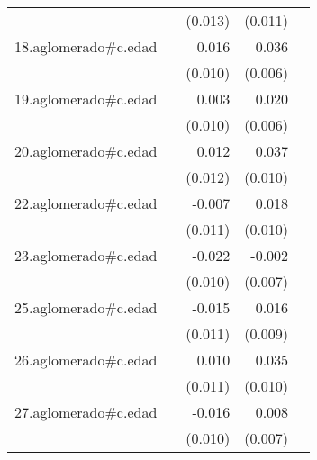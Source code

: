 {\begin{longtable}{l*{4}{D{.}{.}{-1}}}
            &                     &     (0.013)         &     (0.011)         &                     \\
\addlinespace
18.aglomerado#c.edad&                     &       0.016         &       0.036\sym{***}&                     \\
            &                     &     (0.010)         &     (0.006)         &                     \\
\addlinespace
19.aglomerado#c.edad&                     &       0.003         &       0.020\sym{**} &                     \\
            &                     &     (0.010)         &     (0.006)         &                     \\
\addlinespace
20.aglomerado#c.edad&                     &       0.012         &       0.037\sym{***}&                     \\
            &                     &     (0.012)         &     (0.010)         &                     \\
\addlinespace
22.aglomerado#c.edad&                     &      -0.007         &       0.018         &                     \\
            &                     &     (0.011)         &     (0.010)         &                     \\
\addlinespace
23.aglomerado#c.edad&                     &      -0.022\sym{*}  &      -0.002         &                     \\
            &                     &     (0.010)         &     (0.007)         &                     \\
\addlinespace
25.aglomerado#c.edad&                     &      -0.015         &       0.016         &                     \\
            &                     &     (0.011)         &     (0.009)         &                     \\
\addlinespace
26.aglomerado#c.edad&                     &       0.010         &       0.035\sym{***}&                     \\
            &                     &     (0.011)         &     (0.010)         &                     \\
\addlinespace
27.aglomerado#c.edad&                     &      -0.016         &       0.008         &                     \\
            &                     &     (0.010)         &     (0.007)         &                     \\

\end{longtable}}
